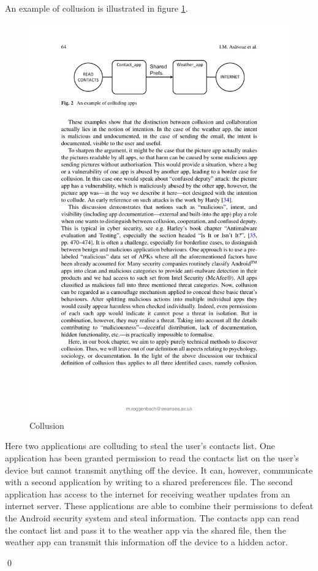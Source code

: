 \begin{myEx}

An example of collusion is illustrated in figure \ref{fig:collusionExample}.\\

\begin{figure}[h!]
  \centering
  \includegraphics[width=\textwidth]{graphics/CollusionExample}
  \caption{Collusion}
  \label{fig:collusionExample}
\end{figure}

Here two applications are colluding to steal the user's contacts list.  One application has been granted permission to read the contacts list on the user's device but cannot transmit anything off the device.  It can, however, communicate with a second application by writing to a shared preferences file.  The second application has access to the internet for receiving weather updates from an internet server.  These applications are able to combine their permissions to defeat the Android security system and steal information.  The contacts app can read the contact list and pass it to the weather app via the shared file, then the weather app can transmit this information off the device to a hidden actor.

\qed
\end{myEx}

